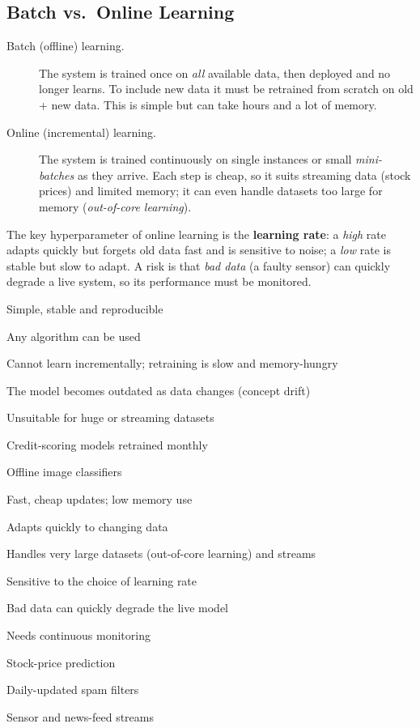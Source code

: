 \subsection{Batch vs.\ Online Learning}

\begin{description}
  \item[Batch (offline) learning.] The system is trained once on \emph{all} available data, then deployed and no longer learns. To include new data it must be retrained from scratch on old + new data. This is simple but can take hours and a lot of memory.
  \item[Online (incremental) learning.] The system is trained continuously on single instances or small \emph{mini-batches} as they arrive. Each step is cheap, so it suits streaming data (stock prices) and limited memory; it can even handle datasets too large for memory (\emph{out-of-core learning}).
\end{description}

The key hyperparameter of online learning is the \textbf{learning rate}: a \emph{high} rate adapts quickly but forgets old data fast and is sensitive to noise; a \emph{low} rate is stable but slow to adapt. A risk is that \emph{bad data} (a faulty sensor) can quickly degrade a live system, so its performance must be monitored.



{\item Simple, stable and reproducible
 \item Any algorithm can be used}
{\item Cannot learn incrementally; retraining is slow and memory-hungry
 \item The model becomes outdated as data changes (concept drift)
 \item Unsuitable for huge or streaming datasets}
{\item Credit-scoring models retrained monthly
 \item Offline image classifiers}

{\item Fast, cheap updates; low memory use
 \item Adapts quickly to changing data
 \item Handles very large datasets (out-of-core learning) and streams}
{\item Sensitive to the choice of learning rate
 \item Bad data can quickly degrade the live model
 \item Needs continuous monitoring}
{\item Stock-price prediction
 \item Daily-updated spam filters
 \item Sensor and news-feed streams}

